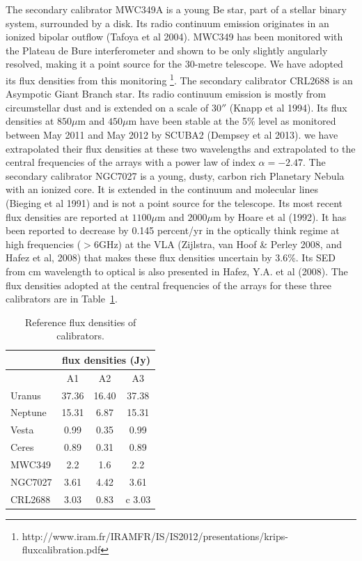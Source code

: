 The secondary calibrator MWC349A is a young Be star, part of a stellar binary system, surrounded by a disk. Its radio
continuum emission originates in an ionized bipolar outflow (Tafoya et al 2004).
MWC349 has been monitored with the  Plateau de Bure interferometer
and shown to be only slightly angularly resolved, making it a point source for the 30-metre telescope. We have adopted
its flux densities from this monitoring \footnote{http://www.iram.fr/IRAMFR/IS/IS2012/presentations/krips-fluxcalibration.pdf}.
The secondary calibrator CRL2688 is an Asympotic Giant Branch star. Its radio continuum emission is mostly from circumstellar dust and
is extended on a scale of $30''$ (Knapp et al 1994).
Its flux densities at $850\mu$m  and $450\mu$m  have been stable at the 5\% level as monitored between May 2011 and
May 2012 by SCUBA2 (Dempsey et al 2013).
we have extrapolated their flux densities at these two wavelengths and extrapolated to the central frequencies
of the arrays with a power law of index $\alpha=-2.47$.
The secondary calibrator NGC7027 is a young, dusty, carbon rich Planetary Nebula with an ionized core.
It is extended in the continuum and molecular lines (Bieging et al 1991) and  is not a point source for the telescope.
Its  most recent flux densities are reported at $1100\mu$m  and $2000\mu$m by Hoare et al (1992). It has been reported
to decrease by 0.145 percent/yr in the optically think regime at high frequencies ($> 6$GHz) at the VLA
(Zijlstra, van Hoof \& Perley 2008, and Hafez et al, 2008) that makes these flux densities uncertain by 3.6\%.  
Its SED from cm wavelength to optical is also presented in Hafez, Y.A. et al (2008).
The flux densities adopted at the central frequencies of the arrays for these three calibrators are in Table~\ref{tab:fluxPred}.


\begin{table}
\centering
\label{tab:fluxPred}
\caption[]{Reference flux densities of calibrators.}
\begin{tabular}{|l|c|c|c|}
\hline
\multicolumn{1}{|c}{}  & \multicolumn{3}{|c|}{flux densities (Jy)}  \\
\hline
         &    A1      &  A2   &   A3    \\
\hline
Uranus   &  37.36  & 16.40 &  37.38 \\
Neptune  &  15.31  &  6.87 &  15.31  \\
Vesta    &  0.99   &  0.35 &  0.99 \\
Ceres    &  0.89   &  0.31 &  0.89   \\
MWC349   &  2.2   &    1.6 &   2.2 \\
NGC7027  &  3.61   &  4.42 &  3.61 \\
CRL2688  &  3.03  &   0.83 &c 3.03  \\
\hline
\end{tabular}
\end{table}





